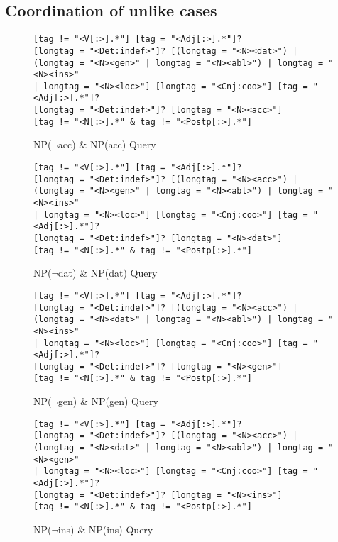 \newpage

\subsection{Coordination of unlike cases}

\begin{figure}[!h]
	\begin{lstlisting}
[tag != "<V[:>].*"] [tag = "<Adj[:>].*"]? 
[longtag = "<Det:indef>"]? [(longtag = "<N><dat>") | 
(longtag = "<N><gen>" | longtag = "<N><abl>") | longtag = "<N><ins>" 
| longtag = "<N><loc>"] [longtag = "<Cnj:coo>"] [tag = "<Adj[:>].*"]? 
[longtag = "<Det:indef>"]? [longtag = "<N><acc>"] 
[tag != "<N[:>].*" & tag != "<Postp[:>].*"]
	\end{lstlisting}
	\caption{NP($\neg$acc) \& NP(acc) Query}
	\label{CQl_npacc}
\end{figure}

\begin{figure}[!h]
	\begin{lstlisting}
[tag != "<V[:>].*"] [tag = "<Adj[:>].*"]? 
[longtag = "<Det:indef>"]? [(longtag = "<N><acc>") | 
(longtag = "<N><gen>" | longtag = "<N><abl>") | longtag = "<N><ins>" 
| longtag = "<N><loc>"] [longtag = "<Cnj:coo>"] [tag = "<Adj[:>].*"]? 
[longtag = "<Det:indef>"]? [longtag = "<N><dat>"] 
[tag != "<N[:>].*" & tag != "<Postp[:>].*"]
	\end{lstlisting}
	\caption{NP($\neg$dat) \& NP(dat) Query}
	\label{CQl_npdat}
\end{figure}

\begin{figure}[!h]
	\begin{lstlisting}
[tag != "<V[:>].*"] [tag = "<Adj[:>].*"]? 
[longtag = "<Det:indef>"]? [(longtag = "<N><acc>") | 
(longtag = "<N><dat>" | longtag = "<N><abl>") | longtag = "<N><ins>" 
| longtag = "<N><loc>"] [longtag = "<Cnj:coo>"] [tag = "<Adj[:>].*"]? 
[longtag = "<Det:indef>"]? [longtag = "<N><gen>"] 
[tag != "<N[:>].*" & tag != "<Postp[:>].*"]
	\end{lstlisting}
	\caption{NP($\neg$gen) \& NP(gen) Query}
	\label{CQl_npgen}
\end{figure}

\begin{figure}[!h]
	\begin{lstlisting}
[tag != "<V[:>].*"] [tag = "<Adj[:>].*"]? 
[longtag = "<Det:indef>"]? [(longtag = "<N><acc>") | 
(longtag = "<N><dat>" | longtag = "<N><abl>") | longtag = "<N><gen>" 
| longtag = "<N><loc>"] [longtag = "<Cnj:coo>"] [tag = "<Adj[:>].*"]? 
[longtag = "<Det:indef>"]? [longtag = "<N><ins>"] 
[tag != "<N[:>].*" & tag != "<Postp[:>].*"]
	\end{lstlisting}
	\caption{NP($\neg$ins) \& NP(ins) Query}
	\label{CQl_npins}
\end{figure}

